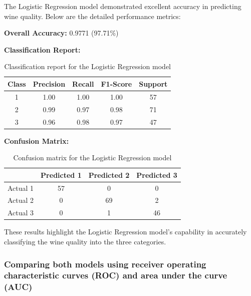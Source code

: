\documentclass[twocolumn]{article}
\begin{document}
	The Logistic Regression model demonstrated excellent accuracy in predicting wine
	quality. Below are the detailed performance metrics:
\smallskip

	\textbf{Overall Accuracy:} 0.9771 (97.71\%)
\smallskip

	\textbf{Classification Report:}
	\begin{table}[H]
		\centering
		\begin{tabular}{|c|c|c|c|c|}
			\hline
			Class & Precision & Recall & F1-Score & Support \\
			\hline
			1     & 1.00      & 1.00   & 1.00     & 57      \\
			\hline
			2     & 0.99      & 0.97   & 0.98     & 71      \\
			\hline
			3     & 0.96      & 0.98   & 0.97     & 47      \\
			\hline
		\end{tabular}
		\caption{Classification report for the Logistic Regression model}
	\end{table}

	\textbf{Confusion Matrix:}
	\begin{table}[H]
		\centering
		\begin{tabular}{|c|c|c|c|}
			\hline
			         & Predicted 1 & Predicted 2 & Predicted 3 \\
			\hline
			Actual 1 & 57          & 0           & 0           \\
			\hline
			Actual 2 & 0           & 69          & 2           \\
			\hline
			Actual 3 & 0           & 1           & 46          \\
			\hline
		\end{tabular}
		\caption{Confusion matrix for the Logistic Regression model}
	\end{table}
	These results highlight the Logistic Regression model's capability in accurately
	classifying the wine quality into the three categories.
    \newpage
	\subsubsection{Comparing both models using receiver operating characteristic
	curves (ROC) and area under the curve (AUC)}
\end{document}
